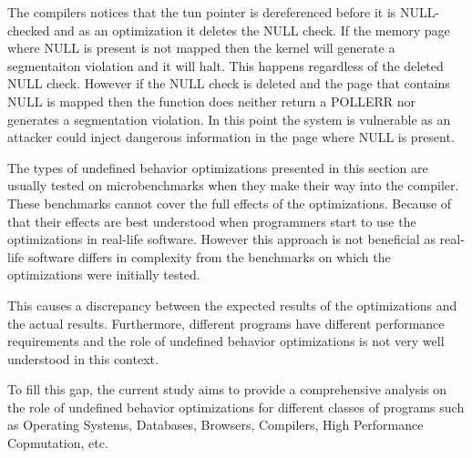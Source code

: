 The compilers notices that the tun pointer is dereferenced before it is
NULL-checked and as an optimization it deletes the NULL check. If the
memory page where NULL is present is not mapped then the kernel will
generate a segmentaiton violation and it will halt. This happens
regardless of the deleted NULL check. However if the NULL check is
deleted and the page that contains NULL is mapped then the function does
neither return a POLLERR nor generates a segmentation violation. In this
point the system is vulnerable as an attacker could inject dangerous
information in the page where NULL is present.

The types of undefined behavior optimizations presented in this section
are usually tested on microbenchmarks when they make their way into the
compiler. These benchmarks cannot cover the full effects of the
optimizations. Because of that their effects are best understood when
programmers start to use the optimizations in real-life software.
However this approach is not beneficial as real-life software differs in
complexity from the benchmarks on which the optimizations were initially
tested.

This causes a discrepancy between the expected results of the
optimizations and the actual results. Furthermore, different programs
have different performance requirements and the role of undefined
behavior optimizations is not very well understood in this context.

To fill this gap, the current study aims to provide a comprehensive
analysis on the role of undefined behavior optimizations for different
classes of programs such as Operating Systems, Databases, Browsers,
Compilers, High Performance Copmutation, etc.
